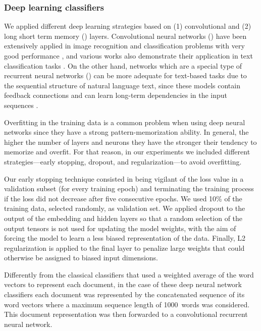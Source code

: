 \subsubsection{Deep learning classifiers}

We applied different deep learning strategies based on (1) convolutional and (2) long short term memory () layers.
Convolutional neural networks () have been extensively applied in image recognition and classification problems with very good performance \parencite{rawat2017a}, and various works also demonstrate their application in text classification tasks \parencite{rios2015a}.
On the other hand,  networks which are a special type of recurrent neural networks () can be more adequate for text-based tasks due to the sequential structure of natural language text, since these models contain feedback connections and can learn long-term dependencies in the input sequences \parencite{hochreiter1997a,graves2012b}.

Overfitting in the training data is a common problem when using deep neural networks since they have a strong pattern-memorization ability.
In general, the higher the number of layers and neurons they have the stronger their tendency to memorize and overfit.
For that reason, in our experiments we included different strategies---early stopping, dropout, and regularization---to avoid overfitting.

Our early stopping technique consisted in being vigilant of the loss value in a validation subset (for every training epoch) and terminating the training process if the loss did not decrease after five consecutive epochs.
We used 10\% of the training data, selected randomly, as validation set.
We applied dropout to the output of the embedding and hidden layers so that a random selection of the output tensors is not used for updating the model weights, with the aim of forcing the model to learn a less biased representation of the data.
Finally, L2 regularization is applied to the final layer to penalize large weights that could otherwise be assigned to biased input dimensions.

Differently from the classical classifiers that used a weighted average of the word vectors to represent each document, in the case of these deep neural network classifiers each document was represented by the concatenated sequence of its word vectors where a maximum sequence length of 1000~words was considered.
This document representation was then forwarded to a convolutional recurrent neural network.

